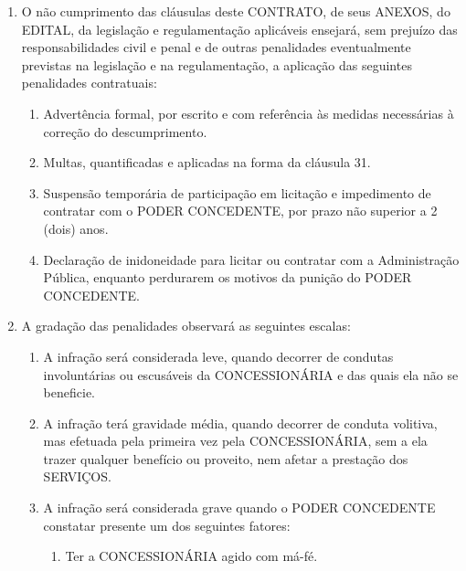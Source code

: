 \documentclass[a4paper,11pt]{report} %
\begin{document}
\begin{enumerate}
\item \label{itm:MYPW} O não cumprimento das cláusulas deste CONTRATO, de seus ANEXOS, do EDITAL, da legislação e regulamentação aplicáveis ensejará, sem prejuízo das responsabilidades civil e penal e de outras penalidades eventualmente previstas na legislação e na regulamentação, a aplicação das seguintes penalidades contratuais:

\begin{enumerate}[label*=\arabic*.]
\item \label{itm:YFC4} Advertência formal, por escrito e com referência às medidas necessárias à correção do descumprimento.

\item \label{itm:HA9D} Multas, quantificadas e aplicadas na forma da cláusula 31.

\item \label{itm:UDUR} Suspensão temporária de participação em licitação e impedimento de contratar com o PODER CONCEDENTE, por prazo não superior a 2 (dois) anos.

\item \label{itm:RFL9} Declaração de inidoneidade para licitar ou contratar com a Administração Pública, enquanto perdurarem os motivos da punição do PODER CONCEDENTE.
\end{enumerate}

\item \label{itm:NAA8} A gradação das penalidades observará as seguintes escalas:

\begin{enumerate}[label*=\arabic*.]
\item \label{itm:4HRC} A infração será considerada leve, quando decorrer de condutas involuntárias ou escusáveis da CONCESSIONÁRIA e das quais ela não se beneficie.

\item \label{itm:4XBG} A infração terá gravidade média, quando decorrer de conduta volitiva, mas efetuada pela primeira vez pela CONCESSIONÁRIA, sem a ela trazer qualquer benefício ou proveito, nem afetar a prestação dos SERVIÇOS.

\item \label{itm:HSFP} A infração será considerada grave quando o PODER CONCEDENTE constatar presente um dos seguintes fatores:

\begin{enumerate}[label*=\arabic*.]
\item \label{itm:PBDV} Ter a CONCESSIONÁRIA agido com má-fé.


\end{enumerate}
\end{enumerate}
\end{enumerate}
\end{document}
